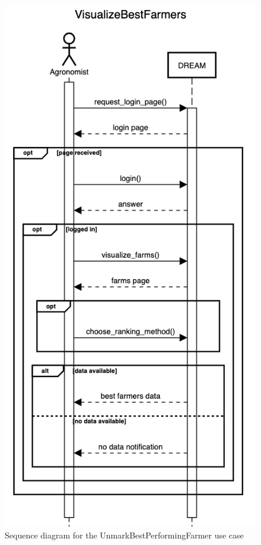 \documentclass{article}
\begin{document}
\begin{figure}[H]
    \centering
	\includegraphics[scale=0.5]{sequence_diagrams/VisualizeBestFarmers}
    \caption{Sequence diagram for the UnmarkBestPerformingFarmer use case}
\end{figure}
\end{document}
